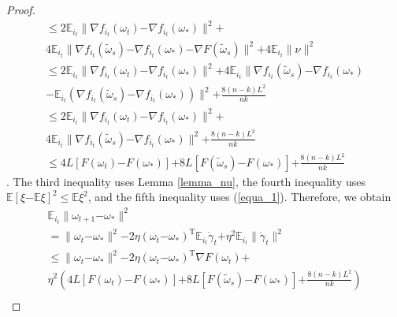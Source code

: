 \documentclass[letterpaper]{article}
\begin{document}
\begin{proof}
\begin{equation}
\begin{array}{ll}
\le 2\mathbb{E}_{i_t} \parallel \nabla f_{i_{t}}(\omega_{t}) \mathrm{-} \nabla f_{i_{t}}(\omega_{\ast}) \parallel^2  \mathrm{+} \\
4 \mathbb{E}_{i_t} \parallel  \nabla f_{i_{t}}(\tilde{\omega}_{s}) \mathrm{-} \nabla f_{i_{t}}(\omega_{\ast}) \mathrm{-} \nabla F(\tilde{\omega}_s) \parallel^2 \mathrm{+} 4\mathbb{E}_{i_t} \parallel \nu  \parallel^2 \\ 
\le 2\mathbb{E}_{i_t} \parallel \nabla f_{i_{t}}(\omega_{t}) \mathrm{-} \nabla f_{i_{t}}(\omega_{\ast}) \parallel^2  \mathrm{+} 4 \mathbb{E}_{i_t} \parallel  \nabla f_{i_{t}}(\tilde{\omega}_{s}) \mathrm{-} \nabla f_{i_{t}}(\omega_{\ast}) \\
\mathrm{-} \mathbb{E}_{i_t} \left ( \nabla f_{i_t}(\tilde{\omega}_s) \mathrm{-} \nabla f_{i_t}(\omega_\ast)   \right)\parallel^2   \mathrm{+} \frac{8(n-k)L^2}{nk}   \\ 
\le 2\mathbb{E}_{i_t} \parallel \nabla f_{i_{t}}(\omega_{t}) \mathrm{-} \nabla f_{i_{t}}(\omega_{\ast}) \parallel^2  \mathrm{+} \\
4 \mathbb{E}_{i_t} \parallel  \nabla f_{i_{t}}(\tilde{\omega}_{s}) \mathrm{-} \nabla f_{i_{t}}(\omega_{\ast}) \parallel^2 \mathrm{+} \frac{8(n-k)L^2}{nk} \\
\le 4L [F(\omega_t)\mathrm{-}F(\omega_\ast)] \mathrm{+}  8L [F(\tilde{\omega}_s)\mathrm{-}F(\omega_\ast)] \mathrm{+} \frac{8(n-k)L^2}{nk}
\end{array} 
\end{equation}.  The third inequality uses Lemma \ref{lemma_nu},  the fourth inequality uses $\mathbb{E}[\xi\mathrm{-}\mathbb{E}\xi]^2 \le \mathbb{E}\xi^2$, and the fifth inequality uses (\ref{equa_1}). Therefore, we obtain 
\begin{equation}
\begin{array}{ll}
\mathbb{E}_{i_t}\parallel  \omega_{t+1}\mathrm{-}\omega_\ast \parallel^2\\
=\parallel  \omega_{t}\mathrm{-}\omega_\ast  \parallel^2  \mathrm{-}2\eta(\omega_t\mathrm{-}\omega_\ast)^\mathrm{T}\mathbb{E}_{i_t}\dot{\gamma}_{t}  \mathrm{+}  \eta^2 \mathbb{E}_{i_t}\parallel  \dot{\gamma}_{t}  \parallel^2  \\
\le \parallel  \omega_{t}\mathrm{-}\omega_\ast  \parallel^2  \mathrm{-}2\eta(\omega_t\mathrm{-}\omega_\ast)^\mathrm{T}\nabla F(\omega_t) \mathrm{+} \\
\eta^2 \left(  4L [F(\omega_t)\mathrm{-}F(\omega_\ast)] \mathrm{+} 8L [F(\tilde{\omega}_s)\mathrm{-}F(\omega_\ast)] \mathrm{+} \frac{8(n-k)L^2}{nk} \right)  \\ 

\end{array}
\end{equation}
\end{proof}
\end{document}
